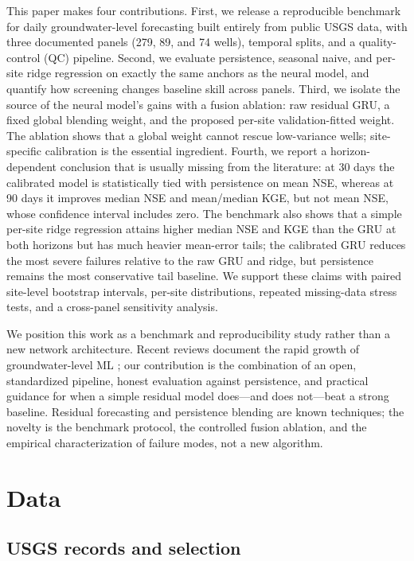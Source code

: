 \documentclass[preprint,12pt]{elsarticle}
\begin{document}
This paper makes four contributions. First, we release a reproducible
benchmark for daily groundwater-level forecasting built entirely from public
USGS data, with three documented panels (279, 89, and 74 wells), temporal
splits, and a quality-control (QC) pipeline. Second, we evaluate persistence,
seasonal naive, and per-site ridge regression on exactly the same anchors as
the neural model, and quantify how screening changes baseline skill across
panels. Third, we isolate the source of the neural model's gains with a fusion
ablation: raw residual GRU, a fixed global blending weight, and the proposed
per-site validation-fitted weight. The ablation shows that a global weight
cannot rescue low-variance wells; site-specific calibration is the essential
ingredient. Fourth, we report a horizon-dependent conclusion that is usually
missing from the literature: at 30 days the calibrated model is statistically
tied with persistence on mean NSE, whereas at 90 days it improves median NSE
and mean/median KGE, but not mean NSE, whose confidence interval includes zero.
The benchmark also shows that a simple per-site ridge regression attains
higher median NSE and KGE than the GRU at both horizons but has much heavier
mean-error tails; the calibrated GRU reduces the most severe failures relative
to the raw GRU and ridge, but persistence remains the most conservative tail
baseline. We support these claims with paired site-level bootstrap intervals,
per-site distributions, repeated missing-data stress tests, and a cross-panel
sensitivity analysis.

We position this work as a benchmark and reproducibility study rather than a
new network architecture. Recent reviews document the rapid growth of
groundwater-level ML \citep{khan2023}; our contribution is the combination of
an open, standardized pipeline, honest evaluation against persistence, and
practical guidance for when a simple residual model does---and does not---beat
a strong baseline. Residual forecasting and persistence blending are known
techniques; the novelty is the benchmark protocol, the controlled fusion
ablation, and the empirical characterization of failure modes, not a new
algorithm.

\section{Data}

\subsection{USGS records and selection}
\end{document}
